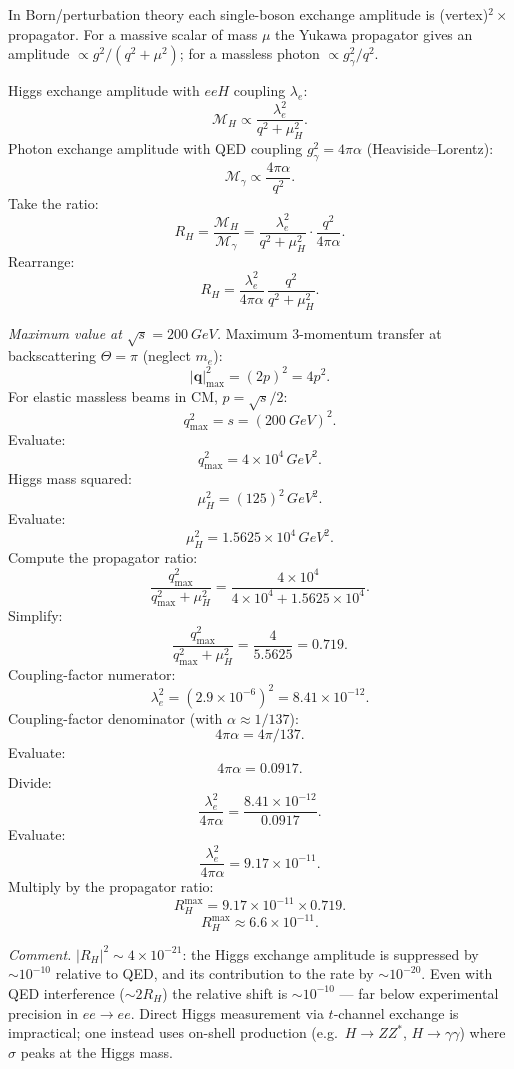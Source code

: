 \documentclass[11pt]{article}
\begin{document}
\begin{center}
\end{center}

In Born/perturbation theory each single-boson exchange amplitude is (vertex)$^2 \times$ propagator. For a massive scalar of mass $\mu$ the Yukawa propagator gives an amplitude $\propto g^2/(q^2+\mu^2)$; for a massless photon $\propto g_\gamma^2/q^2$.

Higgs exchange amplitude with $eeH$ coupling $\lambda_e$:
\[ \mathcal M_H \propto \frac{\lambda_e^2}{q^2 + \mu_H^2}. \]
Photon exchange amplitude with QED coupling $g_\gamma^2 = 4\pi\alpha$ (Heaviside--Lorentz):
\[ \mathcal M_\gamma \propto \frac{4\pi\alpha}{q^2}. \]
Take the ratio:
\[ R_H = \frac{\mathcal M_H}{\mathcal M_\gamma} = \frac{\lambda_e^2}{q^2 + \mu_H^2}\cdot\frac{q^2}{4\pi\alpha}. \]
Rearrange:
\[ \boxed{\;R_H = \frac{\lambda_e^2}{4\pi\alpha}\,\frac{q^2}{q^2+\mu_H^2}.\;} \]

\textit{Maximum value at $\sqrt s = \SI{200}{GeV}$.} Maximum 3-momentum transfer at backscattering $\Theta=\pi$ (neglect $m_e$):
\[ |\bm q|^2_{\max} = (2p)^2 = 4p^2. \]
For elastic massless beams in CM, $p = \sqrt s/2$:
\[ q^2_{\max} = s = (\SI{200}{GeV})^2. \]
Evaluate:
\[ q^2_{\max} = 4\times 10^4\,\si{GeV^2}. \]
Higgs mass squared:
\[ \mu_H^2 = (125)^2\,\si{GeV^2}. \]
Evaluate:
\[ \mu_H^2 = 1.5625\times 10^4\,\si{GeV^2}. \]
Compute the propagator ratio:
\[ \frac{q^2_{\max}}{q^2_{\max}+\mu_H^2} = \frac{4\times 10^4}{4\times 10^4 + 1.5625\times 10^4}. \]
Simplify:
\[ \frac{q^2_{\max}}{q^2_{\max}+\mu_H^2} = \frac{4}{5.5625} = 0.719. \]
Coupling-factor numerator:
\[ \lambda_e^2 = (2.9\times 10^{-6})^2 = 8.41\times 10^{-12}. \]
Coupling-factor denominator (with $\alpha\approx 1/137$):
\[ 4\pi\alpha = 4\pi/137. \]
Evaluate:
\[ 4\pi\alpha = 0.0917. \]
Divide:
\[ \frac{\lambda_e^2}{4\pi\alpha} = \frac{8.41\times 10^{-12}}{0.0917}. \]
Evaluate:
\[ \frac{\lambda_e^2}{4\pi\alpha} = 9.17\times 10^{-11}. \]
Multiply by the propagator ratio:
\[ R_H^{\max} = 9.17\times 10^{-11} \times 0.719. \]
\[ \boxed{\;R_H^{\max} \approx 6.6\times 10^{-11}.\;} \]

\textit{Comment.} $|R_H|^2\sim 4\times 10^{-21}$: the Higgs exchange amplitude is suppressed by $\sim 10^{-10}$ relative to QED, and its contribution to the rate by $\sim 10^{-20}$. Even with QED interference ($\sim 2R_H$) the relative shift is $\sim 10^{-10}$ — far below experimental precision in $ee\to ee$. Direct Higgs measurement via $t$-channel exchange is impractical; one instead uses on-shell production (e.g.\ $H\to ZZ^*$, $H\to \gamma\gamma$) where $\sigma$ peaks at the Higgs mass.
\end{document}
